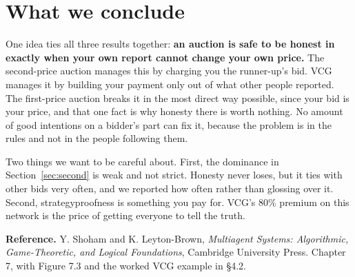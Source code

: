 \documentclass[10pt,a4paper]{article}
\begin{document}
\section{What we conclude}

One idea ties all three results together: \textbf{an auction is safe to be honest in exactly
when your own report cannot change your own price.} The second-price auction manages this by
charging you the runner-up's bid. VCG manages it by building your payment only out of what
other people reported. The first-price auction breaks it in the most direct way possible,
since your bid is your price, and that one fact is why honesty there is worth nothing. No
amount of good intentions on a bidder's part can fix it, because the problem is in the rules
and not in the people following them.

Two things we want to be careful about. First, the dominance in Section~\ref{sec:second} is
weak and not strict. Honesty never loses, but it ties with other bids very often, and we
reported how often rather than glossing over it. Second, strategyproofness is something you
pay for. VCG's $80\%$ premium on this network is the price of getting everyone to tell the
truth.

\vspace{1em}
\noindent\textbf{Reference.} Y. Shoham and K. Leyton-Brown, \emph{Multiagent Systems:
Algorithmic, Game-Theoretic, and Logical Foundations}, Cambridge University Press.
Chapter 7, with Figure 7.3 and the worked VCG example in \S4.2.
\end{document}
